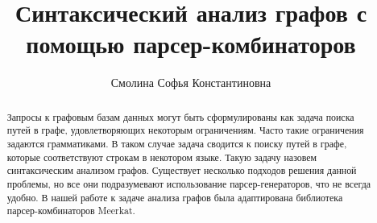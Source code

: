 \title{Синтаксический анализ графов с помощью парсер-комбинаторов}
\author{Смолина Софья Константиновна}
\maketitle

\begin{abstract}
Запросы к графовым базам данных могут быть сформулированы как
задача поиска путей в графе, удовлетворяющих некоторым ограничениям.
Часто такие ограничения задаются грамматиками. В таком случае задача
сводится к поиску путей в графе, которые соответствуют строкам в
некотором языке. Такую задачу назовем синтаксическим анализом графов.
Существует несколько подходов решения данной проблемы, но все они
подразумевают использование парсер-генераторов, что не всегда удобно. В
нашей работе к задаче анализа графов была адаптирована библиотека парсер-комбинаторов Meerkat.
\end{abstract}







